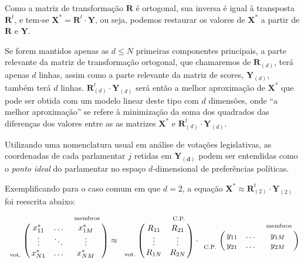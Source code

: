 \documentclass[
	article,			%
	12pt,				%
	oneside,			%
	a4paper,			%
	english,			%
	brazil,				%
	sumario=tradicional,
	oldfontcommands %
	]{abntex2}
\let\bbordermatrix\bordermatrix
\begin{document}


Como a matriz de transformação $\mathbf{R}$ é ortogonal, sua inversa é igual à transposta $\mathbf{R}^{t}$, e tem-se $\mathbf{X^{*}} = \mathbf{R}^t \cdot \mathbf{Y}$, ou seja, podemos restaurar os valores de $\mathbf{X^{*}}$ a partir de $\mathbf{R}$ e $\mathbf{Y}$.

Se forem mantidos apenas as $d \leq N$ primeiras componentes principais, a parte relevante da matriz de transformação ortogonal, que chamaremos de $\mathbf{R}_{(d)}$, terá apenas $d$ linhas, assim como a parte relevante da matriz de scores, $\mathbf{Y}_{(d)}$, também terá $d$ linhas. $\mathbf{R}_{(d)}^{t}\cdot \mathbf{Y}_{(d)}$ será então a melhor aproximação de $\mathbf{X^{*}}$ que pode ser obtida com um modelo linear deste tipo com $d$ dimensões, onde ``a melhor aproximação'' se refere à minimização da soma dos quadrados das diferenças dos valores entre as as matrizes $\mathbf{X^*}$ e $\mathbf{R}_{(d)}^{t}\cdot \mathbf{Y}_{(d)}$. 

Utilizando uma nomenclatura usual em análise de votações legislativas, as coordenadas de cada parlamentar $j$ retidas em $\mathbf{Y_{(d)}}$ podem ser entendidas como o \emph{ponto ideal} do parlamentar no espaço $d$-dimensional de preferências políticas.

Exemplificando para o caso comum em que $d=2$, a equação $\mathbf{X^{*}} \approx \mathbf{R}_{(2)}^{t} \cdot \mathbf{Y}_{(2)}$ foi reescrita abaixo:
\[
  \bbordermatrix{~  & ~ & ~ & ~_\text{membros} \cr
                ~ & x^{*}_{11} & \ldots & x^{*}_{1M}   \cr
                ~ & \vdots & \ddots & \vdots  \cr
                ~_\text{vot.} & x^{*}_{N1} & \ldots & x^{*}_{NM}   \cr
                } \approx
  \bbordermatrix{~  & ~ & ~_\text{C.P.} \cr
                ~ & R_{11} & R_{21}   \cr
                ~ & \vdots & \vdots  \cr
                ~_\text{vot.} & R_{1N} & R_{2N} \cr
                } \cdot
  \bbordermatrix{~  & ~ & ~ & ~_\text{membros} \cr
                ~ & y_{11} & \ldots & y_{1M}   \cr
                ~_\text{C.P.} & y_{21} & \ldots & y_{2M}   \cr
                }
\]
\end{document}
